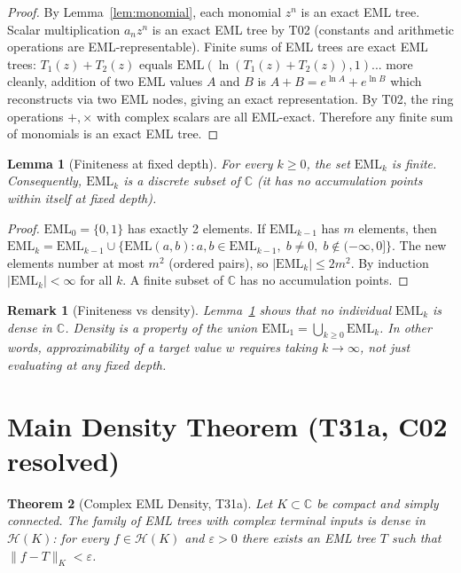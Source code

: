 \documentclass[11pt]{article}
\newtheorem{theorem}{Theorem}
\newtheorem{lemma}[theorem]{Lemma}
\newtheorem{remark}{Remark}
\begin{document}
\begin{proof}
By Lemma~\ref{lem:monomial}, each monomial $z^n$ is an exact EML tree.
Scalar multiplication $a_n z^n$ is an exact EML tree by T02 (constants and
arithmetic operations are EML-representable).  Finite sums of EML trees are
exact EML trees: $T_1(z) + T_2(z)$ equals
$\mathrm{EML}(\ln(T_1(z) + T_2(z)),1)$... more cleanly, addition of two EML values
$A$ and $B$ is $A + B = e^{\ln A} + e^{\ln B}$ which reconstructs via two EML
nodes, giving an exact representation.  By T02, the ring operations $+,\times$
with complex scalars are all EML-exact.  Therefore any finite sum of monomials
is an exact EML tree.
\end{proof}

\begin{lemma}[Finiteness at fixed depth]\label{lem:finite}
For every $k \ge 0$, the set $\mathrm{EML}_k$ is finite.
Consequently, $\mathrm{EML}_k$ is a discrete subset of $\mathbb{C}$ (it has no
accumulation points within itself at fixed depth).
\end{lemma}

\begin{proof}
$\mathrm{EML}_0 = \{0,1\}$ has exactly 2 elements.
If $\mathrm{EML}_{k-1}$ has $m$ elements, then
$\mathrm{EML}_k = \mathrm{EML}_{k-1} \cup
  \{\mathrm{EML}(a,b) : a,b \in \mathrm{EML}_{k-1},\; b \ne 0,\; b \notin (-\infty,0]\}$.
The new elements number at most $m^2$ (ordered pairs), so $|\mathrm{EML}_k| \le 2m^2$.
By induction $|\mathrm{EML}_k| < \infty$ for all $k$.  A finite subset of $\mathbb{C}$
has no accumulation points.
\end{proof}

\begin{remark}[Finiteness vs density]
Lemma~\ref{lem:finite} shows that no individual $\mathrm{EML}_k$ is dense in
$\mathbb{C}$.  Density is a property of the \emph{union}
$\mathrm{EML}_1 = \bigcup_{k\ge0}\mathrm{EML}_k$.
In other words, approximability of a target value $w$ requires
taking $k \to \infty$, not just evaluating at any fixed depth.
\end{remark}

\section{Main Density Theorem (T31a, C02 resolved)}

\begin{theorem}[Complex EML Density, T31a]\label{thm:density}
Let $K \subset \mathbb{C}$ be compact and simply connected.  The family of EML
trees with complex terminal inputs is dense in $\mathcal{H}(K)$: for every
$f \in \mathcal{H}(K)$ and $\varepsilon > 0$ there exists an EML tree $T$ such
that $\|f - T\|_K < \varepsilon$.
\end{theorem}
\end{document}
